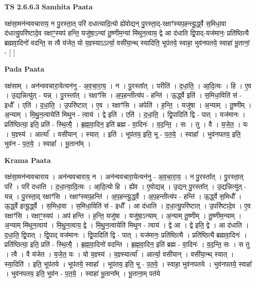 \documentclass[17pt]{extarticle}
\begin{document}
\textbf{TS 2.6.6.3 } \newline
\textbf{Samhita Paata} \newline

रक्ष॑सा॒मन॑न्ववचाराय॒ न पु॒रस्ता॒त् परि॑ दधात्यादि॒त्यो ह्ये॑वोद्यन् पु॒रस्ता॒द्-रक्षाꣳ॑स्यप॒हन्त्यू॒र्द्ध्वे स॒मिधा॒वा द॑धात्यु॒परि॑ष्टादे॒व रक्षाꣳ॒॒स्यप॑ हन्ति॒ यजु॑षा॒ऽन्यां तू॒ष्णीम॒न्यां मि॑थुन॒त्वाय॒ द्वे आ द॑धाति द्वि॒पाद्-यज॑मानः॒ प्रति॑ष्ठित्यै ब्रह्मवा॒दिनो॑ वदन्ति॒ स त्वै य॑जेत॒ यो य॒ज्ञ्स्याऽऽर्त्या॒ वसी॑या॒न्थ् स्यादिति॒ भूप॑तये॒ स्वाहा॒ भुव॑नपतये॒ स्वाहा॑ भू॒तानां॒ - [  ] \newline

\textbf{Pada Paata} \newline

रक्ष॑साम् । अन॑न्ववचारा॒येत्यन॑नु - अ॒व॒चा॒रा॒य॒ । न । पु॒रस्ता᳚त् । परीति॑ । द॒धा॒ति॒ । आ॒दि॒त्यः । हि । ए॒व । उ॒द्यन्नित्यु॑त् - यन्न् । पु॒रस्ता᳚त् । रक्षाꣳ॑सि । अ॒प॒हन्तीत्य॑प - हन्ति॑ । ऊ॒र्द्ध्वे इति॑ । स॒मिधा॒विति॑ सं - इधौ᳚ । एति॑ । द॒धा॒ति॒ । उ॒परि॑ष्टात् । ए॒व । रक्षाꣳ॑सि । अपेति॑ । ह॒न्ति॒ । यजु॑षा । अ॒न्याम् । तू॒ष्णीम् । अ॒न्याम् । मि॒थु॒न॒त्वायेति॑ मिथुन - त्वाय॑ । द्वे इति॑ । एति॑ । द॒धा॒ति॒ । द्वि॒पादिति॑ द्वि - पात् । यज॑मानः । प्रति॑ष्ठित्या॒ इति॒ प्रति॑ - स्थि॒त्यै॒ । ब्र॒ह्म॒वा॒दिन॒ इति॑ ब्रह्म - वा॒दिनः॑ । व॒द॒न्ति॒ । सः । तु । वै । य॒जे॒त॒ । यः । य॒ज्ञ्स्य॑ । आर्त्या᳚ । वसी॑यान् । स्यात् । इति॑ । भूप॑तय॒ इति॒ भू - प॒त॒ये॒ । स्वाहा᳚ । भुव॑नपतय॒ इति॒ भुव॑न - प॒त॒ये॒ । स्वाहा᳚ । भू॒ताना᳚म् ।  \newline


\textbf{Krama Paata} \newline

रक्ष॑सा॒मन॑न्ववचाराय । अन॑न्ववचाराय॒ न । अन॑न्ववचारा॒येत्यन॑नु - अ॒व॒चा॒रा॒य॒ । न पु॒रस्ता᳚त् । पु॒रस्ता॒त् परि॑ । परि॑ दधाति । द॒धा॒त्या॒दि॒त्यः । आ॒दि॒त्यो हि । ह्ये॑व । ए॒वोद्यन्न् । उ॒द्यन् पु॒रस्ता᳚त् । उ॒द्यन्नित्यु॑त् - यन्न् । पु॒रस्ता॒द् रक्षाꣳ॑सि । रक्षाꣳ॑स्यप॒हन्ति॑ । अ॒प॒हन्त्यू॒र्द्ध्वे । अ॒प॒हन्तीत्य॑प - हन्ति॑ । ऊ॒र्द्ध्वे स॒मिधौ᳚ । ऊ॒र्द्ध्वे इत्यू॒र्द्ध्वे । स॒मिधा॒वा । स॒मिधा॒विति॑ सं - इधौ᳚ । आ द॑धाति । द॒धा॒त्यु॒परि॑ष्टात् । उ॒परि॑ष्टादे॒व । ए॒व रक्षाꣳ॑सि । रक्षाꣳ॒॒स्यप॑ । अप॑ हन्ति । ह॒न्ति॒ यजु॑षा । यजु॑षा॒ऽन्याम् । अ॒न्याम् तू॒ष्णीम् । तू॒ष्णीम॒न्याम् । अ॒न्याम् मि॑थुन॒त्वाय॑ । मि॒थु॒न॒त्वाय॒ द्वे । मि॒थु॒न॒त्वायेति॑ मिथुन - त्वाय॑ । द्वे आ । द्वे इति॒ द्वे । आ द॑धाति । द॒धा॒ति॒ द्वि॒पात् । द्वि॒पाद् यज॑मानः । द्वि॒पादिति॑ द्वि - पात् । यज॑मानः॒ प्रति॑ष्ठित्यै । प्रति॑ष्ठित्यै ब्रह्मवा॒दिनः॑ । प्रति॑ष्ठित्या॒ इति॒ प्रति॑ - स्थि॒त्यै॒ । ब्र॒ह्म॒वा॒दिनो॑ वदन्ति । ब्र॒ह्म॒वा॒दिन॒ इति॑ ब्रह्म - वा॒दिनः॑ । व॒द॒न्ति॒ सः । स तु । त्वै । वै य॑जेत । य॒जे॒त॒ यः । यो य॒ज्ञ्स्य॑ । य॒ज्ञ्स्यार्त्या᳚ । आर्त्या॒ वसी॑यान् । वसी॑या॒न्थ् स्यात् । स्या॒दिति॑ । इति॒ भूप॑तये । भूप॑तये॒ स्वाहा᳚ । भूप॑तय॒ इति॒ भू - प॒त॒ये॒ । स्वाहा॒ भुव॑नपतये । भुव॑नपतये॒ स्वाहा᳚ । भुव॑नपतय॒ इति॒ भुव॑न - प॒त॒ये॒ । स्वाहा॑ भू॒ताना᳚म् । भू॒ताना॒म् पत॑ये \newline
\end{document}
